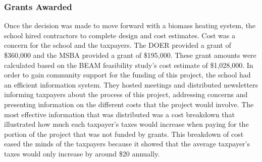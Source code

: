 \subsubsection{Grants Awarded}
\par Once the decision was made to move forward with a biomass heating system, the school hired contractors to complete design and cost estimates. Cost was a concern for the school and the taxpayers. The DOER provided a grant of \$360,000 and the MSBA provided a grant of \$195,000. These grant amounts were calculated based on the BEAM feasibility study’s cost estimate of \$1,028,000. In order to gain community support for the funding of this project, the school had an efficient information system. They hosted meetings and distributed newsletters informing taxpayers about the process of this project, addressing concerns and presenting information on the different costs that the project would involve. The most effective information that was distributed was a cost breakdown that illustrated how much each taxpayer’s taxes would increase when paying for the portion of the project that was not funded by grants. This breakdown of cost eased the minds of the taxpayers because it showed that the average taxpayer’s taxes would only increase by around \$20 annually.

